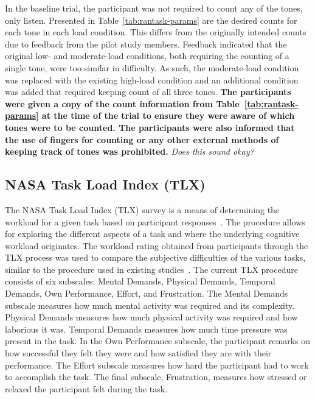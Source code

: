 \documentclass[11pt]{article}
\begin{document}
	In the baseline trial, the participant was not required to count any of the tones, only listen. Presented in Table~\ref{tab:rantask-params} are the desired counts for each tone in each load condition. This differs from the originally intended counts due to feedback from the pilot study members. Feedback indicated that the original low- and moderate-load conditions, both requiring the counting of a single tone, were too similar in difficulty. As such, the moderate-load condition was replaced with the existing high-load condition and an additional condition was added that required keeping count of all three tones. {\bf The participants were given a copy of the count information from Table~\ref{tab:rantask-params} at the time of the trial to ensure they were aware of which tones were to be counted. The participants were also informed that the use of fingers for counting or any other external methods of keeping track of tones was prohibited. }\emph{Does this sound okay?}

	
	\subsection{NASA Task Load Index (TLX)}
	The NASA Task Load Index (TLX) survey is a means of determining the workload for a given task based on participant responses~\cite{NASA}. The procedure allows for exploring the different aspects of a task and where the underlying cognitive workload originates. The workload rating obtained from participants through the TLX process was used to compare the subjective difficulties of the various tasks, similar to the procedure used in existing studies~\cite{Ke, Estepp_2015}. The current TLX procedure consists of six subscales: Mental Demands, Physical Demands, Temporal Demands, Own Performance, Effort, and Frustration. The Mental Demands subscale measures how much mental activity was required and its complexity. Physical Demands measures how much physical activity was required and how laborious it was. Temporal Demands measures how much time pressure was present in the task. In the Own Performance subscale, the participant remarks on how successful they felt they were and how satisfied they are with their performance. The Effort subscale measures how hard the participant had to work to accomplish the task. The final subscale, Frustration, measures how stressed or relaxed the participant felt during the task. 
	
\end{document}
